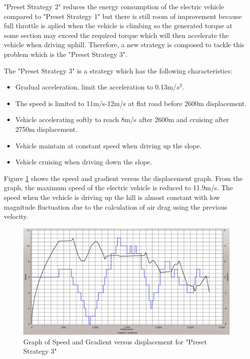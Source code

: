 "Preset Strategy 2" reduces the energy consumption of the electric vehicle compared to "Preset Strategy 1" but there is still room of improvement because full throttle is aplied when the vehicle is climbing so the generated torque at some section may exceed the required torque which will then accelerate the vehicle when driving uphill. Therefore, a new strategy is composed to tackle this problem which is the "Preset Strategy 3".

The "Preset Strategy 3" is a strategy which has the following characteristics:

\begin{itemize}
	\item{Gradual acceleration, limit the acceleration to 0.13m/$s^2$.}
	\item{The speed is limited to 11m/s-12m/s at flat road before 2600m displacement.}
	\item{Vehicle accelerating softly to reach 8m/s after 2600m and cruising after 2750m displacement.}
	\item{Vehicle maintain at constant speed when driving up the slope.}
	\item{Vehicle cruising when driving down the slope.}
\end{itemize}

Figure \ref{im:3_1} shows the speed and gradient versus the displacement graph. From the graph, the maximum speed of the electric vehicle is reduced to 11.9m/s. The speed when the vehicle is driving up the hill is almost constant with low magnitude fluctuation due to the calculation of air drag using the previous velocity. 

\begin{figure}[htb]
	\centering
	\includegraphics[width=6in]{images/3_1.jpg}
	\caption{Graph of Speed and Gradient versus displacement for "Preset Strategy 3"}
	\label{im:3_1}
\end{figure}

